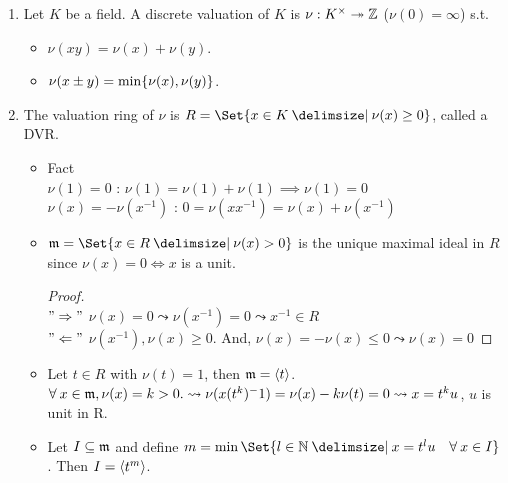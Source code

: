 \begin{definition} \mbox{}
  \begin{enumerate}[(1)]
    \item Let $K$ be a field. A discrete valuation of $K$ is
      $\nu: K^\times \twoheadrightarrow \mathbb{Z}$ ($\nu(0) = \infty$) s.t.
      \begin{itemize}
        \item $\nu(xy) = \nu(x) + \nu(y)$.
        \item $\nu(x \pm y) = \min\lbrace\nu(x), \nu(y)\rbrace$.
      \end{itemize}
    \item The valuation ring of $\nu$ is $R = \Set{x \in K \given \nu(x) \ge 0}$,
      called a DVR.
      \begin{itemize}
        \item Fact \\
          $\nu(1) = 0$ : $\nu(1) = \nu(1) + \nu(1) \implies \nu(1) = 0$ \\
          $\nu(x) = -\nu(x^{-1})$ : $0 = \nu(xx^{-1}) = \nu(x) + \nu(x^{-1})$
        \item $\mf = \Set{x \in R \given \nu(x) > 0}$ is the unique maximal ideal
          in $R$ since $\nu(x) = 0 \iff x$ is a unit.
          \begin{proof} $ $\\
            $"\Rightarrow"$
              $\nu(x) = 0 \leadsto \nu(x^{-1}) = 0 \leadsto x^{-1} \in R$ \\
            $"\Leftarrow"$
              $\nu(x^{-1}),\nu(x) \ge 0.$ And, $\nu(x) = -\nu(x) \le 0 \leadsto 
              \nu(x) = 0$
          \end{proof}
        \item Let $t \in R$ with $\nu(t) = 1$, then $\mathfrak{m} = \langle t\rangle$.\\
          $\forall x \in \mf, \nu(x) = k > 0. \leadsto \nu(x(t^k)^-1) = 
          \nu(x) - k\nu(t) = 0 \leadsto x = t^ku$, $u$ is unit in R.
        \item Let $I \subseteq \mathfrak{m}$ and define
          $m = \min\Set{l \in \Nb \given x = t^l u \quad \forall x \in I}$.
          Then $I = \langle t^m\rangle$.\\
      \end{itemize}
  \end{enumerate}
\end{definition}
\iffalse
